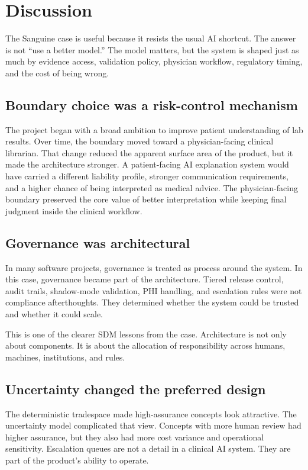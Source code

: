 \section{Discussion}

The Sanguine case is useful because it resists the usual AI shortcut. The answer is not ``use a better model.'' The model matters, but the system is shaped just as much by evidence access, validation policy, physician workflow, regulatory timing, and the cost of being wrong.

\subsection{Boundary choice was a risk-control mechanism}

The project began with a broad ambition to improve patient understanding of lab results. Over time, the boundary moved toward a physician-facing clinical librarian. That change reduced the apparent surface area of the product, but it made the architecture stronger. A patient-facing AI explanation system would have carried a different liability profile, stronger communication requirements, and a higher chance of being interpreted as medical advice. The physician-facing boundary preserved the core value of better interpretation while keeping final judgment inside the clinical workflow.

\subsection{Governance was architectural}

In many software projects, governance is treated as process around the system. In this case, governance became part of the architecture. Tiered release control, audit trails, shadow-mode validation, PHI handling, and escalation rules were not compliance afterthoughts. They determined whether the system could be trusted and whether it could scale.

This is one of the clearer SDM lessons from the case. Architecture is not only about components. It is about the allocation of responsibility across humans, machines, institutions, and rules.

\subsection{Uncertainty changed the preferred design}

The deterministic tradespace made high-assurance concepts look attractive. The uncertainty model complicated that view. Concepts with more human review had higher assurance, but they also had more cost variance and operational sensitivity. Escalation queues are not a detail in a clinical AI system. They are part of the product's ability to operate.

